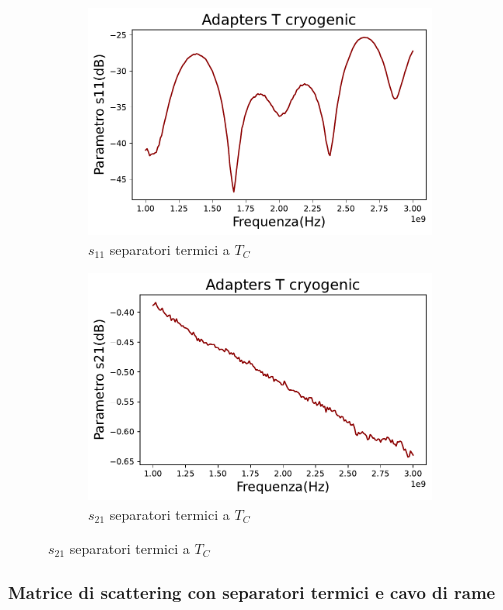 \begin{figure}[H]
\centering

\begin{subfigure}{0.49\textwidth}
	\includegraphics[width=\textwidth]{S11_TC.pdf}
    \caption{$s_{11}$ separatori termici a $T_{C}$}
    \label{fig:sub1}
\end{subfigure}
\hfill
\begin{subfigure}{0.49\textwidth}
    \includegraphics[width=\textwidth]{S21_TC.pdf}
    \caption{$s_{21}$ separatori termici a $T_{C}$}
    \label{fig:sub2}
\end{subfigure}

\end{figure}

\subsubsection{Matrice di scattering con separatori termici e cavo di rame}
\label{ssec:Matrice di scattering con separatori termici e cavo di rame}

